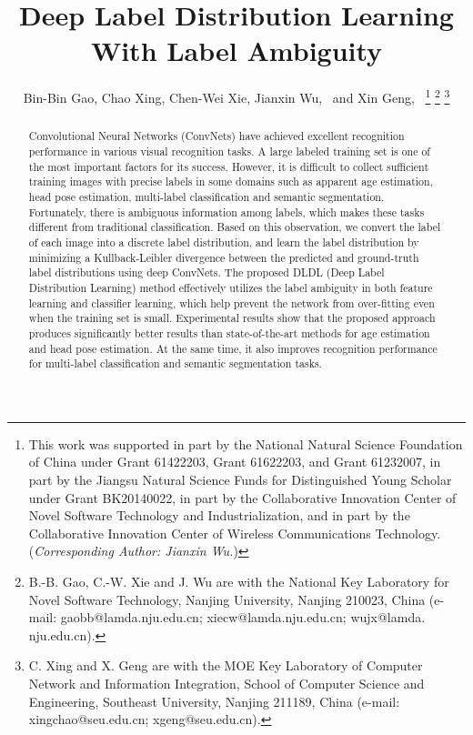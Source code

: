 \documentclass[journal]{IEEEtran}
\begin{document}
\title{Deep Label Distribution Learning \\With Label Ambiguity}
\author{Bin-Bin Gao, Chao Xing, Chen-Wei Xie, Jianxin Wu,~ and Xin Geng,~
\thanks{This work was supported in part
by the National Natural Science Foundation of China under Grant 61422203,
Grant 61622203, and Grant 61232007, in part by the Jiangsu Natural Science 
Funds for Distinguished Young Scholar under Grant BK20140022, in
part by the Collaborative Innovation Center of Novel Software Technology
and Industrialization, and in part by the Collaborative Innovation Center
of Wireless Communications Technology. (\emph{Corresponding Author: Jianxin Wu.})}
\thanks{B.-B. Gao, C.-W. Xie and J. Wu are with the National Key Laboratory for Novel Software Technology, Nanjing University, Nanjing 210023, China (e-mail: gaobb@lamda.nju.edu.cn; xiecw@lamda.nju.edu.cn; wujx@lamda.
nju.edu.cn).}
\thanks{C. Xing and X. Geng are with the MOE Key Laboratory of Computer
Network and Information Integration, School of Computer Science
and Engineering, Southeast University, Nanjing 211189, China (e-mail:
xingchao@seu.edu.cn; xgeng@seu.edu.cn).}
}


\maketitle

\begin{abstract}
Convolutional Neural Networks (ConvNets) have achieved excellent recognition performance in various visual recognition tasks. A large labeled training set is one of the most important factors for its success. However, it is difficult to collect sufficient training images with precise labels in some domains such as apparent age estimation, head pose estimation, multi-label classification and semantic segmentation. Fortunately, there is ambiguous information among labels, which makes these tasks different from traditional classification. Based on this observation, we convert the label of each image into a discrete label distribution, and learn the label distribution by minimizing a Kullback-Leibler divergence between the predicted and ground-truth label distributions using deep ConvNets. The proposed DLDL (Deep Label Distribution Learning) method effectively utilizes the label ambiguity in both feature learning and classifier learning, which help prevent the network from over-fitting even when the training set is small. Experimental results show that the proposed approach produces significantly better results than state-of-the-art methods for age estimation and head pose estimation. At the same time, it also improves recognition performance for multi-label classification and semantic segmentation tasks.
\end{abstract}
\end{document}
